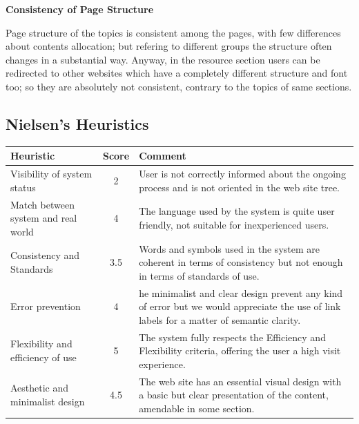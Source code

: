 \medskip
\textbf{Consistency of Page Structure}\par
Page structure of the topics is consistent among the pages, with few differences about contents allocation; but refering to different groups the structure often changes in a substantial way.
Anyway, in the resource section users can be redirected to other websites which have a completely different structure and font too; so they are absolutely not consistent, contrary to the topics of same sections.
\bigskip
\bigskip
\bigskip

\subsection{Nielsen's Heuristics}
\begin{table}[H]
  \begin{center}
    \label{tab:table1}
    \begin{tabular}{||l|c|p{8cm}||} %
      \textbf{Heuristic} & \textbf{Score} & \textbf{Comment}\\
      
      \hline
      Visibility of system status & 2 & User is not correctly informed about the ongoing process and is not oriented in the web site tree.\\
      \hline
      Match between system and real world & 4 & The language used by the system is quite user friendly, not suitable for inexperienced users.\\
      \hline
      Consistency and Standards & 3.5 & Words and symbols used in the system are coherent in terms of consistency but not enough in terms of standards of use.\\
      \hline
      Error prevention & 4 & he minimalist and clear design prevent any kind of error but we would appreciate the use of link labels for a matter of semantic clarity.\\
      \hline
      Flexibility and efficiency of use & 5 & The system fully respects the Efficiency and Flexibility criteria, offering the user a high visit experience.\\
      \hline
      Aesthetic and minimalist design & 4.5 & The web site has an essential visual design with a basic but clear presentation of the content, amendable in some section.\\
    \end{tabular}
  \end{center}
\end{table}

